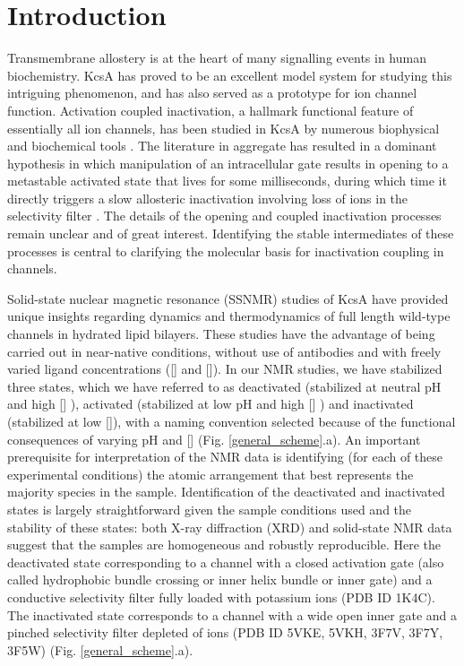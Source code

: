 \documentclass[%
 aip,
 amsmath,amssymb,
 preprint,%
]{revtex4-1}
\begin{document}
\section{Introduction}
Transmembrane allostery is at the heart of many signalling events in human biochemistry.\cite{Cournia2020} KcsA has proved to be an excellent model system for studying this intriguing phenomenon, and has also served as a prototype for ion channel function.\cite{Xu2017} Activation coupled inactivation, a hallmark functional feature of essentially all ion channels, has been studied in KcsA by numerous biophysical and biochemical tools \cite{Li2018,Cuello2017,Xu2019,Furini2020,Ostmeyer2013,Sun2020,Ader2009,Labro2018,Delemotte2018}. The literature in aggregate has resulted in a dominant hypothesis in which manipulation of an intracellular gate results in opening to a metastable activated state that lives for some milliseconds, during which time it directly triggers a slow allosteric inactivation involving loss of ions in the selectivity filter \cite{Li2018,Xu2019,Zhang2020a}. The details of the opening and coupled inactivation processes remain unclear and of great interest. Identifying the stable intermediates of these processes is central to clarifying the molecular basis for inactivation coupling in channels. 

Solid-state nuclear magnetic resonance (SSNMR) studies of KcsA have provided unique insights regarding dynamics and thermodynamics of full length wild-type channels in hydrated lipid bilayers. These studies have the advantage of being carried out in near-native conditions, without use of antibodies and with freely varied ligand concentrations ([] and []). In our NMR studies, we have stabilized three states, which we have referred to as deactivated (stabilized at neutral pH and high [] ), activated (stabilized at low pH and high [] ) and inactivated (stabilized at low []), with a naming convention selected because of the functional consequences of varying pH and [] (Fig. \ref{general_scheme}.a). An important prerequisite for interpretation of the NMR data is identifying (for each of these experimental conditions) the atomic arrangement that best represents the majority species in the sample. Identification of the deactivated and inactivated states is largely straightforward given the sample conditions used and the stability of these states: both X-ray diffraction (XRD) and solid-state NMR data suggest that the samples are homogeneous and robustly reproducible. Here the deactivated state corresponding to a channel with a closed activation gate (also called hydrophobic bundle crossing or inner helix bundle or inner gate) and a conductive selectivity filter fully loaded with potassium ions (PDB ID 1K4C)\cite{Zhou2001,Bhate2013,Wylie2014,Medeiros-Silva2016,Jekhmane2019}. The inactivated state corresponds to a channel with a wide open inner gate and a pinched selectivity filter depleted of ions (PDB ID 5VKE, 5VKH, 3F7V, 3F7Y, 3F5W)\cite{Cuello2010,Ader2009,Bhate2010,Cuello2017} (Fig. \ref{general_scheme}.a). 
\end{document}

